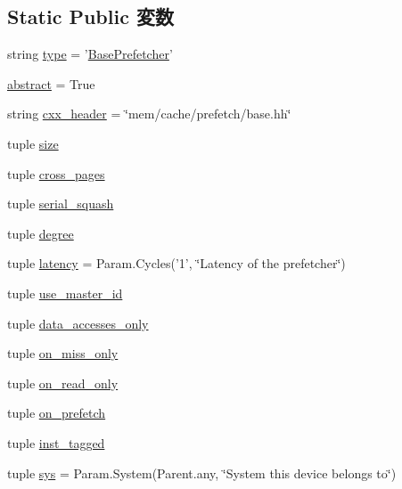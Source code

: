 \subsection*{Static Public 変数}
\begin{DoxyCompactItemize}
\item 
string \hyperlink{classPrefetcher_1_1BasePrefetcher_acce15679d830831b0bbe8ebc2a60b2ca}{type} = '\hyperlink{classPrefetcher_1_1BasePrefetcher}{BasePrefetcher}'
\item 
\hyperlink{classPrefetcher_1_1BasePrefetcher_a17fa61ac3806b481cafee5593b55e5d0}{abstract} = True
\item 
string \hyperlink{classPrefetcher_1_1BasePrefetcher_a17da7064bc5c518791f0c891eff05fda}{cxx\_\-header} = \char`\"{}mem/cache/prefetch/base.hh\char`\"{}
\item 
tuple \hyperlink{classPrefetcher_1_1BasePrefetcher_a377e5da8df1f89c5468c8b8cd07eac89}{size}
\item 
tuple \hyperlink{classPrefetcher_1_1BasePrefetcher_ad0785a32065cd1e34887ccc7ac8bb0a5}{cross\_\-pages}
\item 
tuple \hyperlink{classPrefetcher_1_1BasePrefetcher_a73e837ffabf56c7c76342acc48b4da48}{serial\_\-squash}
\item 
tuple \hyperlink{classPrefetcher_1_1BasePrefetcher_a905c31e5b655fd35cb079a4afb20b7a8}{degree}
\item 
tuple \hyperlink{classPrefetcher_1_1BasePrefetcher_ab6371bb71615c96debd0d27d34943fed}{latency} = Param.Cycles('1', \char`\"{}Latency of the prefetcher\char`\"{})
\item 
tuple \hyperlink{classPrefetcher_1_1BasePrefetcher_a872d17cf1763524380e96f1be5328427}{use\_\-master\_\-id}
\item 
tuple \hyperlink{classPrefetcher_1_1BasePrefetcher_a40e617b19a135a4d354e77f775d57017}{data\_\-accesses\_\-only}
\item 
tuple \hyperlink{classPrefetcher_1_1BasePrefetcher_a111f7ead7904e055617c3a196f4725ae}{on\_\-miss\_\-only}
\item 
tuple \hyperlink{classPrefetcher_1_1BasePrefetcher_a3f1aca2bea28c435d912ee480beee72b}{on\_\-read\_\-only}
\item 
tuple \hyperlink{classPrefetcher_1_1BasePrefetcher_a4d2de2c48fce59e76568dfcf445e8903}{on\_\-prefetch}
\item 
tuple \hyperlink{classPrefetcher_1_1BasePrefetcher_a11272c9ffaf66f5ab8370ae66fe440bf}{inst\_\-tagged}
\item 
tuple \hyperlink{classPrefetcher_1_1BasePrefetcher_a1f27497e90bf86cc0b513e5c086c9e19}{sys} = Param.System(Parent.any, \char`\"{}System this device belongs to\char`\"{})
\end{DoxyCompactItemize}



